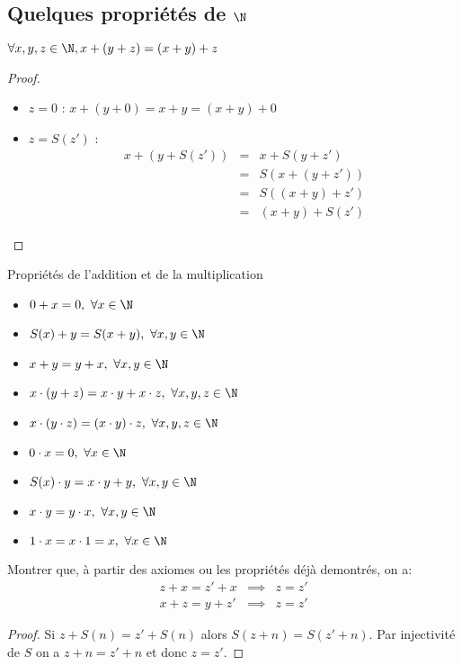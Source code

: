 \subsection{Quelques propriétés de $\N$}


\begin{prop}
	$\forall x, y, z \in \N, x + (y + z) = (x + y) + z$
\end{prop}

\begin{proof}
	\begin{itemize}
		\item $z = 0$ : $x + (y + 0) = x + y = (x + y) + 0$
		\item $z = S(z')$ :
		      \begin{eqnarray*}
			      x + (y + S(z')) & = & x + S(y + z') \\
			      & = & S(x + (y + z')) \\
			      & = & S((x + y) + z') \\
			      & = & (x + y) + S(z')
		      \end{eqnarray*}
	\end{itemize}
\end{proof}

\begin{prop} Propriétés de l'addition et de la multiplication
	\begin{itemize}
		\item $ 0 + x = 0, \ \forall x \in \N$
		\item $S(x) + y = S(x + y), \ \forall x, y \in \N$
		\item $x + y = y + x, \ \forall x, y \in \N$
		\item $x \cdot (y + z) = x \cdot y + x \cdot z, \ \forall x, y, z \in \N$
		\item $x \cdot ( y \cdot z) = (x \cdot y) \cdot z, \ \forall x, y, z \in \N$
		\item $ 0 \cdot x = 0, \ \forall x \in \N$
		\item $S(x) \cdot y = x \cdot y + y, \ \forall x, y \in \N$
		\item $x \cdot y = y \cdot x, \ \forall x, y \in \N$
		\item $1 \cdot x =  x \cdot 1 =  x, \ \forall x \in \N$
	\end{itemize}
\end{prop}


\begin{example}
	Montrer que, à partir des axiomes ou les propriétés déjà demontrés, on a:
	\begin{eqnarray*}
		z + x  = z' + x &\implies& z = z' \\
		x + z  = y + z' &\implies& z = z'
	\end{eqnarray*}
\end{example}

\begin{proof}
	Si $z + S(n) = z' + S(n)$ alors $S(z + n) = S(z' + n)$.
	Par injectivité de $S$ on a $z + n = z' + n$ et donc $z = z'$.
\end{proof}

